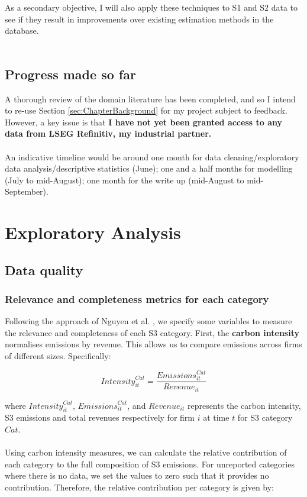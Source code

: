 \documentclass[12pt,twoside]{report}
\begin{document}
As a secondary objective, I will also apply these techniques to S1 and S2 data to see if they result in improvements over existing estimation methods in the database.  
\\\\
\section{Progress made so far}
A thorough review of the domain literature has been completed, and so I intend to re-use Section \ref{sec:ChapterBackground} for my project subject to feedback. However, a key issue is that \textbf{I have not yet been granted access to any data from LSEG Refinitiv, my industrial partner.} 
\\\\
An indicative timeline would be around one month for data cleaning/exploratory data analysis/descriptive statistics (June); one and a half months for modelling (July to mid-August); one month for the write up (mid-August to mid-September). 

\chapter{Exploratory Analysis}
\section{Data quality}
\subsection{Relevance and completeness metrics for each category}\label{sec:RelevanceCompletenessMetrics}

Following the approach of Nguyen et al. \cite{Nguyenetal2023}, we specify some variables to measure the relevance and completeness of each S3 category. First, the \textbf{carbon intensity} normalises emissions by revenue. This allows us to compare emissions across firms of different sizes. Specifically:

\begin{equation}
    \mathit{Intensity}_{it}^{Cat} = \frac{\mathit{Emissions}_{it}^{Cat}}{\mathit{Revenue}_{it}}
\end{equation}

where $\mathit{Intensity}_{it}^{Cat}$, $\mathit{Emissions}_{it}^{Cat}$, and $\mathit{Revenue}_{it}$ represents the carbon intensity, S3 emissions and total revenues respectively for firm $i$ at time $t$ for S3 category $\mathit{Cat}$.
\\\\
Using carbon intensity measures, we can calculate the relative contribution of each category to the full composition of S3 emissions. For unreported categories where there is no data, we set the values to zero such that it provides no contribution. Therefore, the relative contribution per category is given by:
\end{document}
